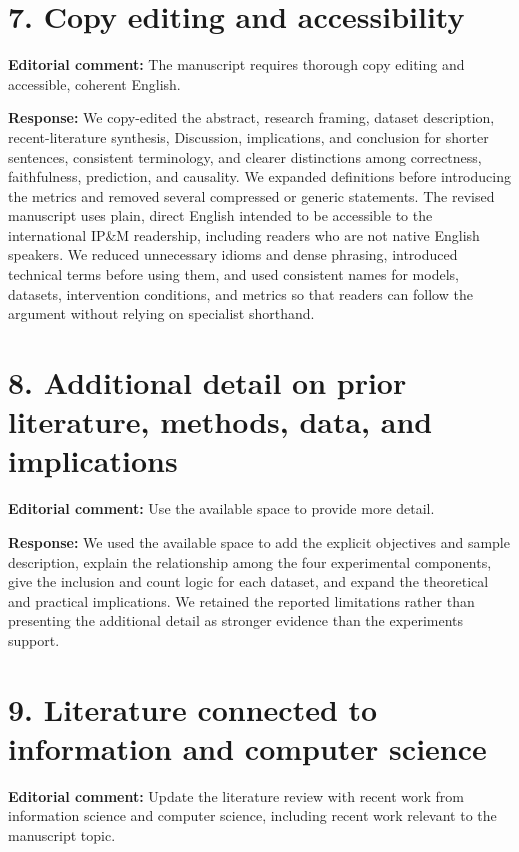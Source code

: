 \documentclass[11pt]{article}
\begin{document}
\section*{7. Copy editing and accessibility}

\textbf{Editorial comment:} The manuscript requires thorough copy editing and accessible, coherent English.

\textbf{Response:} We copy-edited the abstract, research framing, dataset description, recent-literature synthesis, Discussion, implications, and conclusion for shorter sentences, consistent terminology, and clearer distinctions among correctness, faithfulness, prediction, and causality. We expanded definitions before introducing the metrics and removed several compressed or generic statements. The revised manuscript uses plain, direct English intended to be accessible to the international IP\&M readership, including readers who are not native English speakers. We reduced unnecessary idioms and dense phrasing, introduced technical terms before using them, and used consistent names for models, datasets, intervention conditions, and metrics so that readers can follow the argument without relying on specialist shorthand.

\section*{8. Additional detail on prior literature, methods, data, and implications}

\textbf{Editorial comment:} Use the available space to provide more detail.

\textbf{Response:} We used the available space to add the explicit objectives and sample description, explain the relationship among the four experimental components, give the inclusion and count logic for each dataset, and expand the theoretical and practical implications. We retained the reported limitations rather than presenting the additional detail as stronger evidence than the experiments support.

\section*{9. Literature connected to information and computer science}

\textbf{Editorial comment:} Update the literature review with recent work from information science and computer science, including recent work relevant to the manuscript topic.
\end{document}
